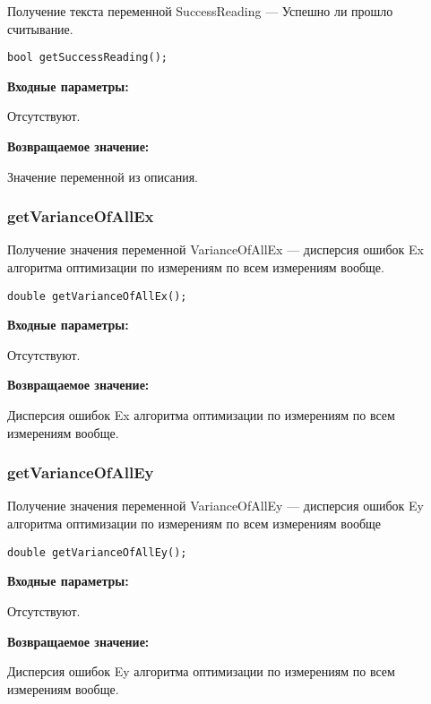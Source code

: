\documentclass[a4paper,12pt]{article}
\begin{document}
Получение текста переменной SuccessReading --- Успешно ли прошло считывание.


\begin{lstlisting}[label=code_syntax_getSuccessReading,caption=Синтаксис]
bool getSuccessReading();
\end{lstlisting}

\textbf{Входные параметры:}

Отсутствуют.

\textbf{Возвращаемое значение:}

Значение переменной из описания.


\subsubsection{getVarianceOfAllEx}\label{getVarianceOfAllEx}

Получение значения переменной VarianceOfAllEx --- дисперсия ошибок Ex алгоритма оптимизации по измерениям по всем измерениям вообще.


\begin{lstlisting}[label=code_syntax_getVarianceOfAllEx,caption=Синтаксис]
double getVarianceOfAllEx();
\end{lstlisting}

\textbf{Входные параметры:}

Отсутствуют.

\textbf{Возвращаемое значение:}

Дисперсия ошибок Ex алгоритма оптимизации по измерениям по всем измерениям вообще.


\subsubsection{getVarianceOfAllEy}\label{getVarianceOfAllEy}

Получение значения переменной VarianceOfAllEy --- дисперсия ошибок Ey алгоритма оптимизации по измерениям по всем измерениям вообще


\begin{lstlisting}[label=code_syntax_getVarianceOfAllEy,caption=Синтаксис]
double getVarianceOfAllEy();
\end{lstlisting}

\textbf{Входные параметры:}

Отсутствуют.

\textbf{Возвращаемое значение:}

Дисперсия ошибок Ey алгоритма оптимизации по измерениям по всем измерениям вообще.
\end{document}
